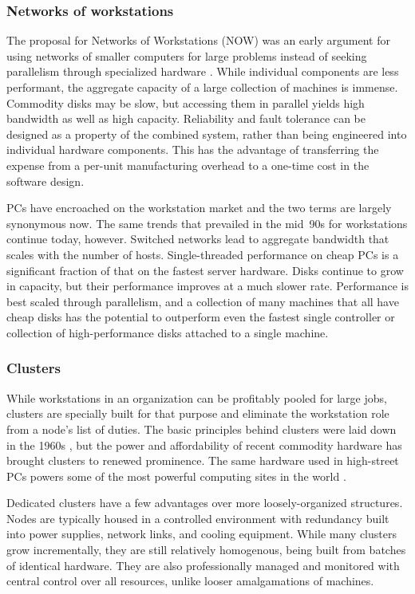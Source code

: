 \subsubsection{Networks of workstations}

The proposal for Networks of Workstations (NOW) was an early argument for using networks of smaller computers for large problems instead of seeking parallelism through specialized hardware \cite{anderson95a}. While individual components are less performant, the aggregate capacity of a large collection of machines is immense. Commodity disks may be slow, but accessing them in parallel yields high bandwidth as well as high capacity. Reliability and fault tolerance can be designed as a property of the combined system, rather than being engineered into individual hardware components. This has the advantage of transferring the expense from a per-unit manufacturing overhead to a one-time cost in the software design.

PCs have encroached on the workstation market and the two terms are largely synonymous now. The same trends that prevailed in the mid~90s for workstations continue today, however. Switched networks lead to aggregate bandwidth that scales with the number of hosts. Single-threaded performance on cheap PCs is a significant fraction of that on the fastest server hardware. Disks continue to grow in capacity, but their performance improves at a much slower rate. Performance is best scaled through parallelism, and a collection of many machines that all have cheap disks has the potential to outperform even the fastest single controller or collection of high-performance disks attached to a single machine.

\subsubsection{Clusters}

While workstations in an organization can be profitably pooled for large jobs, clusters are specially built for that purpose and eliminate the workstation role from a node's list of duties. The basic principles behind clusters were laid down in the 1960s \cite{amdahl}, but the power and affordability of recent commodity hardware has brought clusters to renewed prominence. The same hardware used in high-street PCs powers some of the most powerful computing sites in the world \cite{top500}.

Dedicated clusters have a few advantages over more loosely-organized structures. Nodes are typically housed in a controlled environment with redundancy built into power supplies, network links, and cooling equipment. While many clusters grow incrementally, they are still relatively homogenous, being built from batches of identical hardware. They are also professionally managed and monitored with central control over all resources, unlike looser amalgamations of machines.

